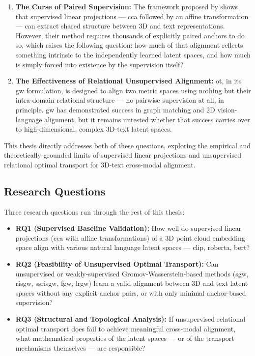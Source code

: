 \begin{enumerate}

\item \textbf{The Curse of Paired Supervision:} The framework proposed by \textcite{hadgi2025escaping} shows that supervised linear projections --- \gls{cca} followed by an affine transformation --- can extract shared structure between 3D and text representations. However, their method requires thousands of explicitly paired anchors to do so, which raises the following question: how much of that alignment reflects something intrinsic to the independently learned latent spaces, and how much is simply forced into existence by the supervision itself?

\item \textbf{The Effectiveness of Relational Unsupervised Alignment:} \gls{ot}, in its \gls{gw} formulation, is designed to align two metric spaces using nothing but their intra-domain relational structure --- no pairwise supervision at all, in principle. \gls{gw} has demonstrated success in graph matching and 2D vision-language alignment, but it remains untested whether that success carries over to high-dimensional, complex 3D-text latent spaces.

\end{enumerate}

This thesis directly addresses both of these questions, exploring the empirical and theoretically-grounded limits of supervised linear projections and unsupervised relational optimal transport for 3D-text cross-modal alignment.

\subsection{Research Questions}

\label{subsec:research_questions}

Three research questions run through the rest of this thesis:

\begin{itemize}

\item \textbf{RQ1 (Supervised Baseline Validation):} How well do supervised linear projections (\gls{cca} with affine transformations) of a 3D point cloud embedding space align with various natural language latent spaces --- \gls{clip}, \gls{roberta}, \gls{bert}?

\item \textbf{RQ2 (Feasibility of Unsupervised Optimal Transport):} Can unsupervised or weakly-supervised Gromov-Wasserstein-based methods (\gls{sgw}, \gls{risgw}, \gls{ssrisgw}, \gls{fgw}, \gls{lrgw}) learn a valid alignment between 3D and text latent spaces without any explicit anchor pairs, or with only minimal anchor-based supervision?

\item \textbf{RQ3 (Structural and Topological Analysis):} If unsupervised relational optimal transport does fail to achieve meaningful cross-modal alignment, what mathematical properties of the latent spaces --- or of the transport mechanisms themselves --- are responsible?

\end{itemize}

